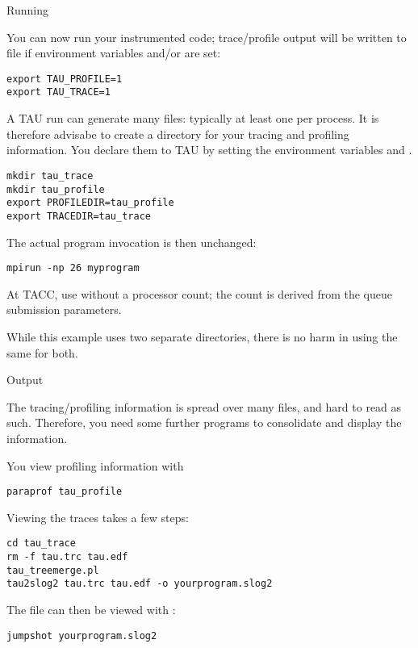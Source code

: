  {Running}

You can now run your instrumented code;
trace/profile output will be written to file 
if environment variables  and/or  are set:
\begin{verbatim}
export TAU_PROFILE=1
export TAU_TRACE=1
\end{verbatim}

A TAU run can generate many files: typically at least one per process.
It is therefore advisabe to create a directory for your tracing and profiling
information. You declare them to TAU by setting the environment variables
 and .
\begin{verbatim}
mkdir tau_trace
mkdir tau_profile
export PROFILEDIR=tau_profile
export TRACEDIR=tau_trace
\end{verbatim}

The actual program invocation is then unchanged:
\begin{verbatim}
mpirun -np 26 myprogram
\end{verbatim}

\begin{tacc}
At TACC, use  without a processor count;
the count is derived from the queue submission parameters.
\end{tacc}

While this example uses two separate directories, there is no
harm in using the same for both.

 {Output}

The tracing/profiling information is spread over many files, and hard to read as such.
Therefore, you need some further programs to consolidate and display the information.

You view profiling information with 
\begin{verbatim}
paraprof tau_profile
\end{verbatim}
Viewing the traces takes a few steps:
\begin{verbatim}
cd tau_trace
rm -f tau.trc tau.edf
tau_treemerge.pl
tau2slog2 tau.trc tau.edf -o yourprogram.slog2 
\end{verbatim}
The  file can then be viewed with :
\begin{verbatim}
jumpshot yourprogram.slog2
\end{verbatim}


